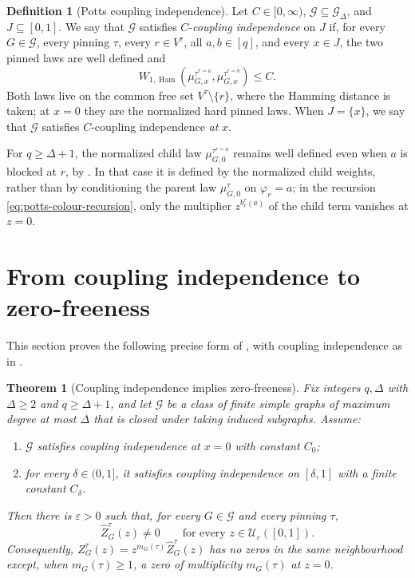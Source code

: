 \documentclass[11pt,reqno]{article}
\theoremstyle{plain}
\newtheorem{theorem}{Theorem}[section]
\theoremstyle{definition}
\newtheorem{definition}[theorem]{Definition}
\theoremstyle{remark}
\theoremstyle{definition}
\newtheorem{definition}[definition]{Definition}
\theoremstyle{remark}
\newcommand{\eps}{\varepsilon}
\DeclareMathOperator{\Ham}{Ham}
\newcommand{\Deg}{\Delta}                        %
\newcommand{\WHam}{W_{1,\Ham}}                   %
\newcommand{\colours}{[q]}                        %
\newcommand{\bcount}{b}
\newcommand{\Gdeg}{\mathcal{G}_{\Deg}}
\newcommand{\Zpin}[2]{Z_{#1}^{#2}}
\newcommand{\nZpin}[2]{\widehat Z_{#1}^{#2}}
\newcommand{\mupin}[3]{\mu_{#1,#3}^{#2}}
\begin{document}
\begin{definition}[Potts coupling independence]\label{def:potts-ci}
Let \(C\in[0,\infty)\), \(\mathcal G\subseteq\Gdeg\), and
\(J\subseteq[0,1]\).  We say that
\(\mathcal G\) satisfies \(C\)-\emph{coupling independence} on \(J\) if,
for every \(G\in\mathcal G\), every pinning \(\tau\), every
\(r\in V^\tau\), all \(a,b\in\colours\), and every \(x\in J\), the two
pinned laws are well defined and
\begin{equation}\label{eq:potts-ci}
  \WHam\!\left(
    \mupin{G}{\tau^{r=a}}{x},
    \mupin{G}{\tau^{r=b}}{x}
  \right)\le C.
\end{equation}
Both laws live on the common free set \(V^\tau\setminus\{r\}\), where the
Hamming distance is taken; at \(x=0\) they are the normalized hard pinned
laws.  When
\(J=\{x\}\), we say that \(\mathcal G\) satisfies \(C\)-coupling
independence \emph{at} \(x\).
\end{definition}

For \(q\ge\Deg+1\), the normalized child law \(\mupin{G}{\tau^{r=a}}{0}\)
remains well defined even when \(a\) is blocked at \(r\), by
.  In that case it is defined by the normalized child
weights, rather than by conditioning the parent law \(\mupin{G}{\tau}{0}\)
on \(\varphi_r=a\); in the recursion \eqref{eq:potts-colour-recursion},
only the multiplier \(z^{\bcount_r^\tau(a)}\) of the child term vanishes
at \(z=0\).

\section{From coupling independence to zero-freeness}
\label{sec:transfer-principle}

This section proves the following precise form of
, with coupling independence as in
.

\begin{theorem}[Coupling independence implies zero-freeness]
\label{thm:potts-transfer}
Fix integers \(q,\Deg\) with \(\Deg\ge2\) and \(q\ge\Deg+1\), and let
\(\mathcal G\) be a class of finite simple graphs of maximum degree at
most \(\Deg\) that is closed under taking induced subgraphs.  Assume:
\begin{enumerate}[label=\textup{(\roman*)}]
  \item \(\mathcal G\) satisfies coupling independence at \(x=0\) with
        constant \(C_0\);
  \item for every \(\delta\in(0,1]\), it satisfies coupling independence
        on \([\delta,1]\) with a finite constant \(C_\delta\).
\end{enumerate}
Then there is \(\eps>0\) such that, for every \(G\in\mathcal G\) and every
pinning \(\tau\),
\[
  \nZpin{G}{\tau}(z)\ne0
  \qquad\text{for every }z\in\mathcal U_\eps([0,1]).
\]
Consequently, \(\Zpin{G}{\tau}(z)=z^{m_G(\tau)}\nZpin{G}{\tau}(z)\) has
no zeros in the same neighbourhood except, when \(m_G(\tau)\ge1\), a zero
of multiplicity \(m_G(\tau)\) at \(z=0\).
\end{theorem}
\end{document}
